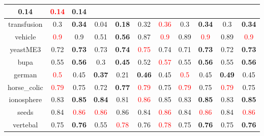 \documentclass{article}%
\begin{document}
\begin{tabular}{c|cccccccccc}
{0.14
}&\textcolor{red}{ 
0.14
}&0.14\\%
\hline%
transfusion&0.3&\textbf{0.34}&0.04&\textbf{0.18}&0.32&\textcolor{red}{ 
0.36
}&0.3&\textbf{0.34}&0.3&\textbf{0.34}\\%
\hline%
vehicle&\textcolor{red}{ 
0.9
}&0.9&0.51&\textbf{0.56}&0.87&\textcolor{red}{ 
0.9
}&0.89&\textcolor{red}{ 
0.9
}&0.89&\textcolor{red}{ 
0.9
}\\%
\hline%
yeastME3&0.72&\textbf{0.73}&0.73&\textbf{0.74}&\textcolor{red}{ 
0.75
}&0.74&0.71&\textbf{0.73}&0.72&\textbf{0.73}\\%
\hline%
bupa&0.55&\textbf{0.56}&0.3&\textbf{0.45}&0.52&\textcolor{red}{ 
0.57
}&0.55&\textbf{0.56}&0.55&\textbf{0.56}\\%
\hline%
german&\textcolor{red}{ 
0.5
}&0.45&\textbf{0.37}&0.21&\textbf{0.46}&0.45&\textcolor{red}{ 
0.5
}&0.45&\textbf{0.49}&0.45\\%
\hline%
horse\_colic&\textcolor{red}{ 
0.79
}&0.75&0.72&\textbf{0.77}&\textcolor{red}{ 
0.79
}&0.75&\textcolor{red}{ 
0.79
}&0.75&\textcolor{red}{ 
0.79
}&0.75\\%
\hline%
ionosphere&0.83&\textbf{0.85}&\textbf{0.84}&0.81&\textcolor{red}{ 
0.86
}&0.85&0.83&\textbf{0.85}&0.83&\textbf{0.85}\\%
\hline%
seeds&0.84&\textcolor{red}{ 
0.86
}&\textcolor{red}{ 
0.86
}&0.86&0.84&\textcolor{red}{ 
0.86
}&0.84&\textcolor{red}{ 
0.86
}&0.84&\textcolor{red}{ 
0.86
}\\%
\hline%
vertebal&0.75&\textbf{0.76}&0.55&\textcolor{red}{ 
0.78
}&0.76&\textcolor{red}{ 
0.78
}&0.75&\textbf{0.76}&0.75&\textbf{0.76}\\%
\hline%
\end{tabular}

%
\end{document}
